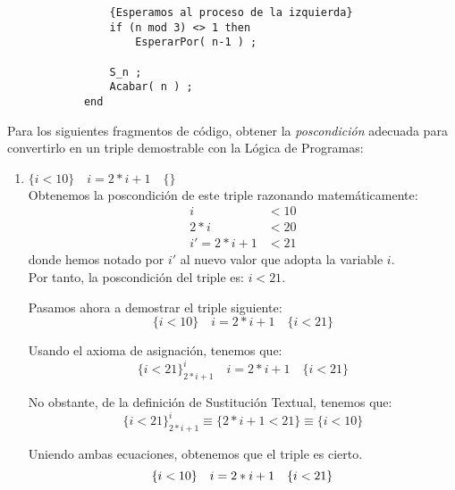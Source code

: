 \begin{ejercicio}
\begin{description}
\begin{verbatim}
                {Esperamos al proceso de la izquierda}
                if (n mod 3) <> 1 then
                    EsperarPor( n-1 ) ;                
                
                S_n ;
                Acabar( n ) ;
            end
        \end{verbatim}
    \end{description}
\end{ejercicio}

\begin{ejercicio}
    Para los siguientes fragmentos de código, obtener la \emph{poscondición} adecuada para convertirlo en un triple demostrable con la Lógica de Programas:
    \begin{enumerate}
        \item $\{i < 10\} \quad i = 2 \ast i + 1 \quad \{ \}$\\
            Obtenemos la poscondición de este triple razonando matemáticamente:
            \begin{align*}
                i &< 10 \\
                2\ast i &< 20 \\
                i' = 2\ast i + 1 &< 21
            \end{align*}
            donde hemos notado por $i'$ al nuevo valor que adopta la variable $i$.\\

            Por tanto, la poscondición del triple es: $i < 21$.

            Pasamos ahora a demostrar el triple siguiente:
            \begin{equation*}
               \{i < 10\} \quad i = 2 \ast i + 1 \quad \{i<21\}
            \end{equation*}
            
            Usando el axioma de asignación, tenemos que:
            \begin{equation*}
                \{i<21\}^i_{2\ast i + 1}\quad i=2\ast i + 1\quad \{i<21\}
            \end{equation*}

            No obstante, de la definición de Sustitución Textual, tenemos que:
            \begin{equation*}
                \{i<21\}^i_{2\ast i + 1} \equiv \{2\ast i + 1 < 21\} \equiv \{i < 10\} 
            \end{equation*}
            
            Uniendo ambas ecuaciones, obtenemos que el triple es cierto.
            \begin{equation*}
                \{i<10\}\quad i=2\ast i + 1\quad \{i<21\} \\
            \end{equation*}


\end{enumerate}
\end{ejercicio}
